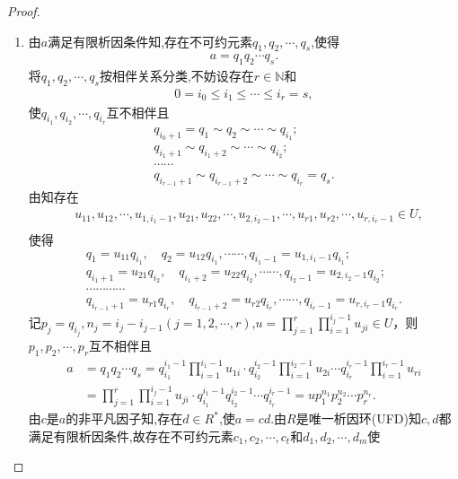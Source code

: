 \documentclass[../../main.tex]{subfiles}%
\begin{document}
\begin{proof}
\begin{enumerate}[(1)]
\item 由$a$满足有限析因条件知,存在不可约元素$q_1,q_2,\cdots,q_s$,使得
\begin{align*}
a=q_1q_2\cdots q_s.
\end{align*}
将$q_1,q_2,\cdots,q_s$按相伴关系分类,不妨设存在$r\in \mathbb{N}$和
\begin{align*}
0=i_0\leqslant i_1\leqslant \cdots\leqslant i_r=s,
\end{align*}
使$q_{i_1},q_{i_2},\cdots,q_{i_r}$互不相伴且
\begin{gather*}
q_{i_0+1}=q_1 \sim q_2 \sim \cdots \sim q_{i_1}; \\
q_{i_1+1} \sim q_{i_1+2}\sim \cdots \sim q_{i_2}; \\
\cdots \cdots \\
q_{i_{r-1}+1} \sim q_{i_{r-1}+2} \sim \cdots \sim q_{i_r} = q_s.
\end{gather*}
由知存在
\begin{align*}
&u_{11},u_{12},\cdots,u_{1,i_1-1},u_{21},u_{22},\cdots,u_{2,i_2-1},\cdots,u_{r1},u_{r2},\cdots,u_{r,i_r-1} \in U, \\
\end{align*}
使得
\begin{gather*}
q_1 = u_{11}q_{i_1}, \quad q_2 = u_{12}q_{i_1}, \cdots \cdots, q_{i_1-1} = u_{1,i_1-1}q_{i_1}; \\
q_{i_1+1} = u_{21}q_{i_2}, \quad q_{i_1+2} = u_{22}q_{i_2}, \cdots \cdots, q_{i_2-1} = u_{2,i_2-1}q_{i_2}; \\
\cdots \cdots \cdots \cdots \\
q_{i_{r-1}+1} = u_{r1}q_{i_r}, \quad q_{i_{r-1}+2} = u_{r2}q_{i_r}, \cdots \cdots, q_{i_r-1} = u_{r,i_r-1}q_{i_r}.
\end{gather*}
记$p_j=q_{i_j},n_j=i_j-i_{j-1}(j=1,2,\cdots,r)$,$u=\prod_{j=1}^r{\prod_{i=1}^{i_j-1}{u_{ji}}}\in U$，则$p_{1},p_{2},\cdots,p_{r}$互不相伴且
\begin{align*}
a &=q_1q_2\cdots q_s=q_{i_1}^{i_1-1}\prod_{i=1}^{i_1-1}{u_{1i}}\cdot q_{i_2}^{i_2-1}\prod_{i=1}^{i_2-1}{u_{2i}}\cdots q_{i_r}^{i_r-1}\prod_{i=1}^{i_r-1}{u_{ri}} \\
&= \prod_{j=1}^r{\prod_{i=1}^{i_j-1}{u_{ji}}}\cdot q_{i_1}^{i_1-1}q_{i_2}^{i_2-1}\cdots q_{i_r}^{i_r-1}=up_{1}^{n_1}p_{2}^{n_2}\cdots p_{r}^{n_r}.
\end{align*}
由$c$是$a$的非平凡因子知,存在$d\in R^*$,使$a=cd$.由$R$是唯一析因环(UFD)知$c,d$都满足有限析因条件,故存在不可约元素$c_1,c_2,\cdots,c_t$和$d_1,d_2,\cdots,d_m$使

\end{enumerate}
\end{proof}
\end{document}

